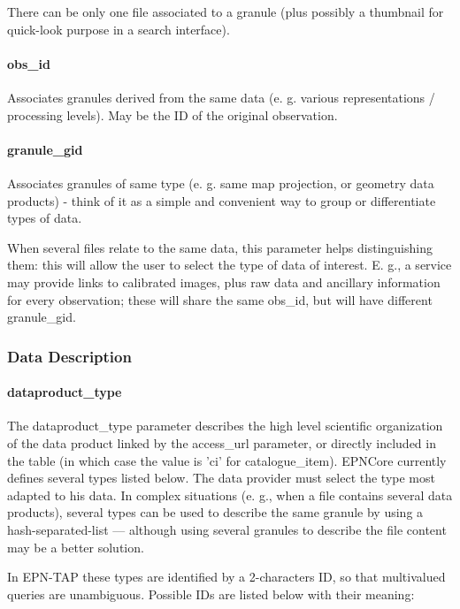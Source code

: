 \documentclass[11pt,a4paper]{ivoa}
\begin{document}
There can be only one file associated to a granule (plus possibly a thumbnail for quick-look purpose in a search interface).

\paragraph{obs\_id}

Associates granules derived from the same data (e. g. various representations / processing levels). May be the ID of the original observation.

\paragraph{granule\_gid}

Associates granules of same type (e. g. same map projection, or geometry data products) - think of it as a simple and convenient way to group or differentiate types of data.

When several files relate to the same data, this parameter helps distinguishing them: this will allow the user to select the type of data of interest. E. g., a service may provide links to calibrated images, plus raw data and ancillary information for every observation; these will share the same obs\_id, but will have different granule\_gid.

\subsubsection{Data Description}

\paragraph{dataproduct\_type}

The dataproduct\_type parameter describes the high level scientific organization of the data product linked by the access\_url parameter, or directly included in the table (in which case the value is 'ci' for catalogue\_item). EPNCore currently defines several types listed below. The data provider must select the type most adapted to his data. In complex situations (e. g., when a file contains several data products), several types can be used to describe the same granule by using a hash-separated-list — although using several granules to describe the file content may be a better solution.  

In EPN-TAP these types are identified by a 2-characters ID, so that multivalued queries are unambiguous. Possible IDs are listed below with their meaning:
\end{document}
